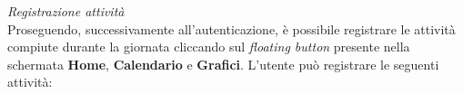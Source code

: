 \documentclass{article}
\begin{document}
\begin{center}
    \begin{figure}[H]
        \centering
    \end{figure}
\end{center}
\textit{Registrazione attività} \vspace*{7pt}\\
Proseguendo, successivamente all'autenticazione, è possibile registrare le attività compiute durante la giornata cliccando sul \textit{floating button} presente nella schermata \textbf{Home}, \textbf{Calendario} e \textbf{Grafici}. L'utente può registrare le seguenti attività:
\end{document}

